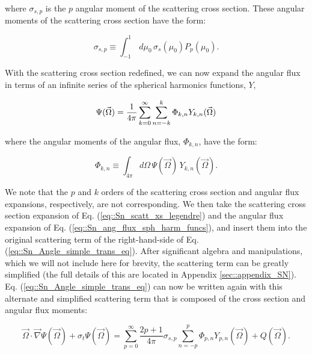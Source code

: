 \noindent where $\sigma_{s,p}$ is the $p$ angular moment of the scattering cross section. These angular moments of the scattering cross section have the form:

\begin{equation}
\label{eq::Sn_scatt_xs_moments}
	\sigma_{s,p} \equiv  \int_{-1}^{1} \, d \mu_0 \, \sigma_s ( \mu_0) P_p (\mu_0)  .
\end{equation}

With the scattering cross section redefined, we can now expand the angular flux in terms of an infinite series of the spherical harmonics functions, $Y$,

\begin{equation}
\label{eq::Sn_ang_flux_sph_harm_funcs}
\Psi (\vec{\Omega}) = \frac{1}{4 \pi} \sum\displaylimits_{k=0}^{\infty} \sum\displaylimits_{n=-k}^{k} \Phi_{k,n} Y_{k,n} (\vec{\Omega})
\end{equation}

\noindent where the angular moments of the angular flux, $\Phi_{k,n}$, have the form:

\begin{equation}
\label{eq::Sn_flux_moments}
	\Phi_{k,n} \equiv \int_{4 \pi} d\Omega \, \Psi(\vec{\Omega}) \, Y_{k,n} (\vec{\Omega}).
\end{equation}

\noindent We note that the $p$ and $k$ orders of the scattering cross section and angular flux expansions, respectively, are not corresponding. We then take the scattering cross section expansion of Eq. (\ref{eq::Sn_scatt_xs_legendre}) and the angular flux expansion of Eq. (\ref{eq::Sn_ang_flux_sph_harm_funcs}), and insert them into the original scattering term of the right-hand-side of Eq. (\ref{eq::Sn_Angle_simple_trans_eq}). After significant algebra and manipulations, which we will not include here for brevity, the scattering term can be greatly simplified (the full details of this are located in Appendix \ref{sec::appendix_SN}). Eq. (\ref{eq::Sn_Angle_simple_trans_eq}) can now be written again with this alternate and simplified scattering term that is composed of the cross section and angular flux moments:

\begin{equation}
\label{eq::Sn_Angle_simple_trans_eq_w_moments_inf}
\vec{\Omega} \cdot \vec{\nabla} \Psi (\vec{\Omega}) + \sigma_t \Psi (\vec{\Omega}) = \sum_{p=0}^{\infty} \frac{2p + 1}{4 \pi} \sigma_{s,p}   \sum_{n=-p}^{p}  \Phi_{p,n}  Y_{p,n} (  \vec{\Omega} )+ Q  (\vec{\Omega}) .
\end{equation}

